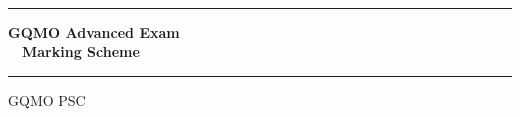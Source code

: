 \documentclass{article}
\title{}
\author{}
\date{}
\renewcommand{\(}{\left(}
\renewcommand{\)}{\right)}
\begin{document}
\thispagestyle{empty}
\allowdisplaybreaks
\begin{center}
\phantom{}\\
\vspace{50pt}

\end{center}
\begin{center}
\vspace{40 pt}
\hrule height 1mm 
\vspace{25 pt}
\fontsize{40}{28}\selectfont
\textbf{\textsf{GQMO Advanced Exam\\\vspace{3pt} \,\,\,\,\,\,Marking Scheme}}\newline
\vspace{5 pt}
\hrule height 1mm 
\vspace{30pt}
\fontsize{26}{28}\selectfont
\textsc{GQMO PSC}
\end{center}
\tableofcontents 

\setcounter{section}{-1}

\pagebreak
\pagebreak

\pagebreak

\pagebreak

\pagebreak

\pagebreak

\pagebreak
\pagebreak

\end{document}
